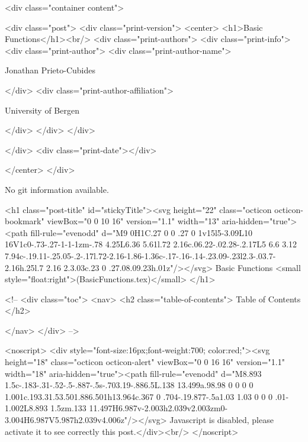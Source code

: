       <div class="container content">
        







<div class="post">
  <div class="print-version">
    <center>
      <h1>Basic Functions</h1><br/>
        <div class="print-authors">
          <div class="print-info">
            <div class="print-author">
              <div class="print-author-name">
                
                  Jonathan Prieto-Cubides
                
              </div>
              <div class="print-author-affiliation">
                
                  University of Bergen
                
                </div>
            </div>
          </div>
          
          
        </div>
        <div class="print-date"></div>
        
        
    </center>
  </div>

  
  No git information available.
  

  <h1 class="post-title" id="stickyTitle"><svg height="22" class="octicon octicon-bookmark" viewBox="0 0 10 16" version="1.1" width="13" aria-hidden="true"><path fill-rule="evenodd" d="M9 0H1C.27 0 0 .27 0 1v15l5-3.09L10 16V1c0-.73-.27-1-1-1zm-.78 4.25L6.36 5.61l.72 2.16c.06.22-.02.28-.2.17L5 6.6 3.12 7.94c-.19.11-.25.05-.2-.17l.72-2.16-1.86-1.36c-.17-.16-.14-.23.09-.23l2.3-.03.7-2.16h.25l.7 2.16 2.3.03c.23 0 .27.08.09.23h.01z"/></svg> Basic Functions <small style="float:right">(BasicFunctions.tex)</small>
  </h1>

  <!-- 
  <div class="toc">
    <nav>
    <h2 class="table-of-contents"> Table of Contents </h2>
      

    </nav>
  </div>
   -->

  <noscript>
  <div style="font-size:16px;font-weight:700; color:red;"><svg height="18" class="octicon octicon-alert" viewBox="0 0 16 16" version="1.1" width="18" aria-hidden="true"><path fill-rule="evenodd" d="M8.893 1.5c-.183-.31-.52-.5-.887-.5s-.703.19-.886.5L.138 13.499a.98.98 0 0 0 0 1.001c.193.31.53.501.886.501h13.964c.367 0 .704-.19.877-.5a1.03 1.03 0 0 0 .01-1.002L8.893 1.5zm.133 11.497H6.987v-2.003h2.039v2.003zm0-3.004H6.987V5.987h2.039v4.006z"/></svg> Javascript is disabled, please activate it to see correctly this post.</div><br/>
  </noscript>

